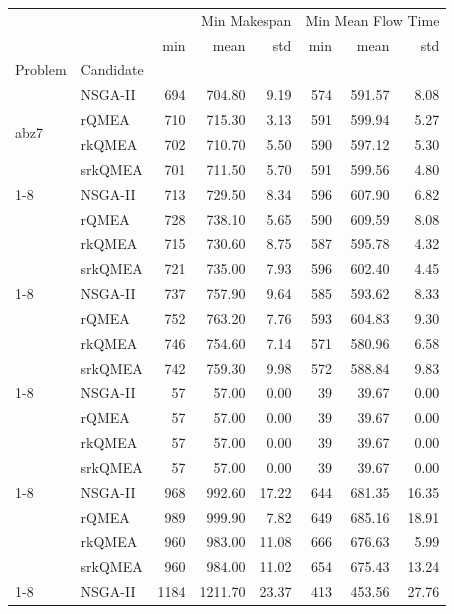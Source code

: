 \begin{tabular}{llrrrrrr}
\toprule
 &  & \multicolumn{3}{r}{Min Makespan} & \multicolumn{3}{r}{Min Mean Flow Time} \\
 &  & min & mean & std & min & mean & std \\
Problem & Candidate &  &  &  &  &  &  \\
\midrule
\multirow[t]{4}{*}{abz7} & NSGA-II & 694 & 704.80 & 9.19 & 574 & 591.57 & 8.08 \\
 & rQMEA & 710 & 715.30 & 3.13 & 591 & 599.94 & 5.27 \\
 & rkQMEA & 702 & 710.70 & 5.50 & 590 & 597.12 & 5.30 \\
 & srkQMEA & 701 & 711.50 & 5.70 & 591 & 599.56 & 4.80 \\
\cline{1-8}
\multirow[t]{4}{*}{abz8} & NSGA-II & 713 & 729.50 & 8.34 & 596 & 607.90 & 6.82 \\
 & rQMEA & 728 & 738.10 & 5.65 & 590 & 609.59 & 8.08 \\
 & rkQMEA & 715 & 730.60 & 8.75 & 587 & 595.78 & 4.32 \\
 & srkQMEA & 721 & 735.00 & 7.93 & 596 & 602.40 & 4.45 \\
\cline{1-8}
\multirow[t]{4}{*}{abz9} & NSGA-II & 737 & 757.90 & 9.64 & 585 & 593.62 & 8.33 \\
 & rQMEA & 752 & 763.20 & 7.76 & 593 & 604.83 & 9.30 \\
 & rkQMEA & 746 & 754.60 & 7.14 & 571 & 580.96 & 6.58 \\
 & srkQMEA & 742 & 759.30 & 9.98 & 572 & 588.84 & 9.83 \\
\cline{1-8}
\multirow[t]{4}{*}{ft06} & NSGA-II & 57 & 57.00 & 0.00 & 39 & 39.67 & 0.00 \\
 & rQMEA & 57 & 57.00 & 0.00 & 39 & 39.67 & 0.00 \\
 & rkQMEA & 57 & 57.00 & 0.00 & 39 & 39.67 & 0.00 \\
 & srkQMEA & 57 & 57.00 & 0.00 & 39 & 39.67 & 0.00 \\
\cline{1-8}
\multirow[t]{4}{*}{ft10} & NSGA-II & 968 & 992.60 & 17.22 & 644 & 681.35 & 16.35 \\
 & rQMEA & 989 & 999.90 & 7.82 & 649 & 685.16 & 18.91 \\
 & rkQMEA & 960 & 983.00 & 11.08 & 666 & 676.63 & 5.99 \\
 & srkQMEA & 960 & 984.00 & 11.02 & 654 & 675.43 & 13.24 \\
\cline{1-8}
\multirow[t]{4}{*}{ft20} & NSGA-II & 1184 & 1211.70 & 23.37 & 413 & 453.56 & 27.76 \\

\end{tabular}
